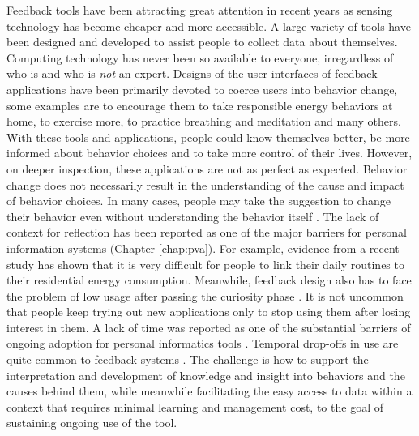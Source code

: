 \documentclass[12pt,oneside]{book}
\begin{document}


\newpage


\label{chap:introduction}

Feedback tools have been attracting great attention in recent years as sensing technology has become cheaper and more accessible. A large variety of tools have been designed and developed to assist people to collect data about themselves.  Computing technology has never been so available to everyone, irregardless of who is and who is \textit{not} an expert.  Designs of the user interfaces of feedback applications have been primarily devoted to coerce users into behavior change, some examples are to encourage them to take responsible energy behaviors at home, to exercise more, to practice breathing and meditation and many others.  With these tools and applications, people could know themselves better, be more informed about behavior choices and to take more control of their lives.  However, on deeper inspection, these applications are not as perfect as expected.  Behavior change does not necessarily result in the understanding of the cause and impact of behavior choices.  In many cases, people may take the suggestion to change their behavior even without understanding the behavior itself \cite{hand_explaining_2005,kuznetsov_upstream:_2010}.  The lack of context for reflection has been reported as one of the major barriers for personal information systems  (Chapter \ref{chap:pva}).  For example, evidence from a recent study \cite{neustaedter_everyday_2013} has shown that it is very difficult for people to link their daily routines to their residential energy consumption.
Meanwhile, feedback design also has to face the problem of low usage after passing the curiosity phase \cite{erickson_dubuque_2013}.  It is not uncommon that people keep trying out new applications only to stop using them after losing interest in them.  A lack of time was reported as one of the substantial barriers of ongoing adoption for personal informatics tools \cite{li_stage-based_2010}.  Temporal drop-offs in use are quite common to feedback systems \cite{bartram_design_2015,karapanos_user_2009, barreto_why_2013, ahtinen_user_2009, pierce_consideration_2010}.
The challenge is how to support the interpretation and development of knowledge and insight into behaviors and the causes behind them, while meanwhile facilitating the easy access to data within a context that requires minimal learning and management cost, to the goal of sustaining ongoing use of the tool.
\end{document}
